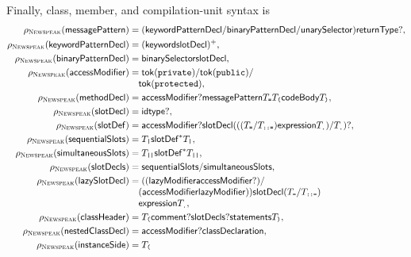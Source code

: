 Finally, class, member, and compilation-unit syntax is
\begin{equation}\label{eq:newspeak-declaration-peg}
\begin{aligned}
 \rho_{\NS}(\mathsf{messagePattern})&=(\mathsf{keywordPatternDecl}/
      \mathsf{binaryPatternDecl}/\mathsf{unarySelector})\mathsf{returnType}?,\\
 \rho_{\NS}(\mathsf{keywordPatternDecl})&=
      (\mathsf{keyword}\mathsf{slotDecl})^+,\\
 \rho_{\NS}(\mathsf{binaryPatternDecl})&=
      \mathsf{binarySelector}\mathsf{slotDecl},\\
 \rho_{\NS}(\mathsf{accessModifier})&=
      \mathsf{tok}(\texttt{private})/\mathsf{tok}(\texttt{public})/\\[-1mm]
 &\quad\mathsf{tok}(\texttt{protected}),\\
 \rho_{\NS}(\mathsf{methodDecl})&=\mathsf{accessModifier}?
      \mathsf{messagePattern}T_{\texttt{=}}T_{\texttt{(}}
      \mathsf{codeBody}T_{\texttt{)}},\\
 \rho_{\NS}(\mathsf{slotDecl})&=\mathsf{id}\mathsf{type}?,\\
 \rho_{\NS}(\mathsf{slotDef})&=\mathsf{accessModifier}?\mathsf{slotDecl}
   (((T_{\texttt{=}}/T_{\texttt{::=}})\mathsf{expression}T_{\texttt{.}})/
      T_{\texttt{.}})?,\\
 \rho_{\NS}(\mathsf{sequentialSlots})&=T_{\texttt{|}}
      \mathsf{slotDef}^*T_{\texttt{|}},\\
 \rho_{\NS}(\mathsf{simultaneousSlots})&=T_{\texttt{||}}
      \mathsf{slotDef}^*T_{\texttt{||}},\\
 \rho_{\NS}(\mathsf{slotDecls})&=
      \mathsf{sequentialSlots}/\mathsf{simultaneousSlots},\\
 \rho_{\NS}(\mathsf{lazySlotDecl})&=
   ((\mathsf{lazyModifier}\mathsf{accessModifier}?)/\\[-1mm]
 &\quad(\mathsf{accessModifier}\mathsf{lazyModifier}))
   \mathsf{slotDecl}(T_{\texttt{=}}/T_{\texttt{::=}})\\[-1mm]
 &\quad\mathsf{expression}T_{\texttt{.}},\\
 \rho_{\NS}(\mathsf{classHeader})&=T_{\texttt{(}}\mathsf{comment}?
      \mathsf{slotDecls}?\mathsf{statements}T_{\texttt{)}},\\
 \rho_{\NS}(\mathsf{nestedClassDecl})&=
      \mathsf{accessModifier}?\mathsf{classDeclaration},\\
 \rho_{\NS}(\mathsf{instanceSide})&=T_{\texttt{(}}\\[-1mm]

\end{aligned}
\end{equation}
